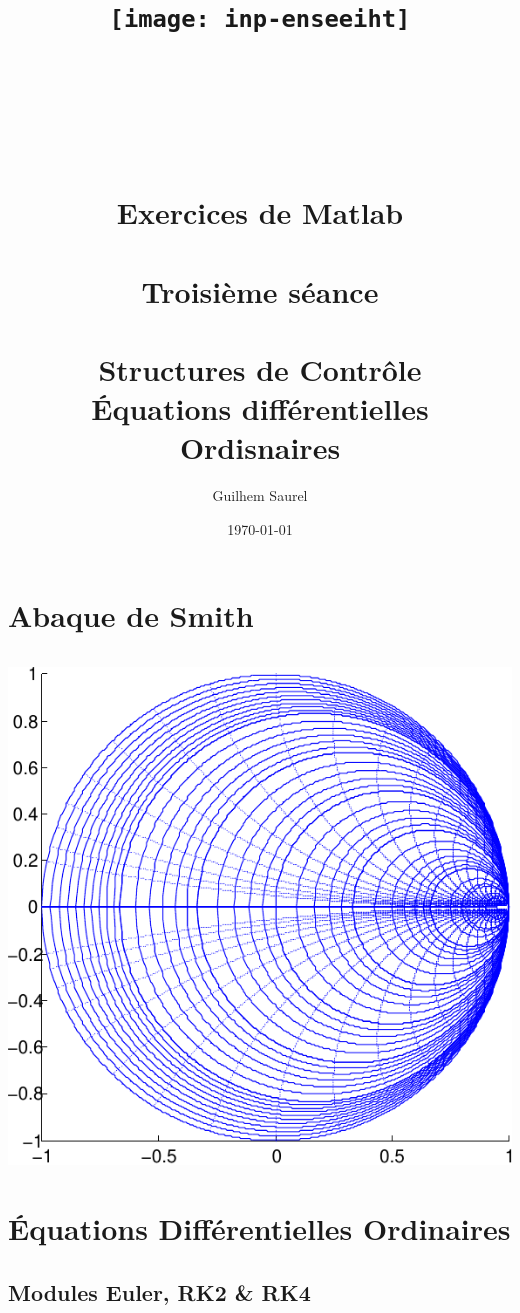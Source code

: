 \documentclass[10pt]{article}
\title{\texttt{[image: inp-enseeiht]} \\ ~ \\ ~ \\ ~ \\ ~ \\ Exercices de Matlab \\ ~ \\ Troisième séance \\ ~  \\ Structures de Contrôle \\ Équations différentielles Ordisnaires}
\author{Guilhem Saurel}
\date{\today}
\begin{document}
 \begin{titlepage}
  \maketitle
  \tableofcontents
 \end{titlepage}

 \section{Abaque de Smith}
  \inputminted[linenos]{matlab}{abaque_de_smith.m}
  \begin{center}
   \includegraphics{abaque_de_smith}
  \end{center}
  \newpage

 \section{Équations Différentielles Ordinaires}
  \subsection{Modules Euler, RK2 \& RK4}
   \inputminted[linenos]{matlab}{eul.m}
   \inputminted[linenos]{matlab}{RK2.m}
   \inputminted[linenos]{matlab}{RK4.m}
\end{document}
